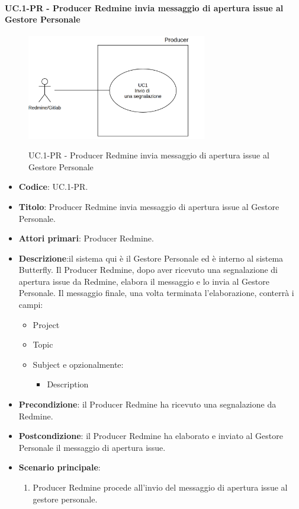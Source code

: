 	\paragraph{UC\theuccount.1-PR - Producer Redmine invia messaggio di apertura issue al Gestore Personale}
	\begin{figure}[H]
		\centering
		\includegraphics[width=0.7\textwidth]{img/UC1.png}\\
		\caption{UC\theuccount.1-PR - Producer Redmine invia messaggio di apertura issue al Gestore Personale}
	\end{figure}
	\begin{itemize}
		\item \textbf{Codice}: UC\theuccount.1-PR.
		\item \textbf{Titolo}: Producer Redmine invia messaggio di apertura issue al Gestore Personale.
		\item \textbf{Attori primari}: Producer Redmine.
		\item \textbf{Descrizione}:il sistema qui è il Gestore Personale
		ed è interno al sistema Butterfly. Il Producer Redmine, dopo aver
		ricevuto una segnalazione di apertura issue da Redmine, elabora
		il messaggio e lo invia al Gestore Personale.
		Il messaggio finale, una volta terminata l'elaborazione, conterrà i campi:
		\begin{itemize}
			\item Project
			\item Topic
			\item Subject e opzionalmente:
			\begin{itemize}
				\item Description
			\end{itemize}
		\end{itemize}
		\item \textbf{Precondizione}: il Producer Redmine ha ricevuto una segnalazione da Redmine.
		\item \textbf{Postcondizione}: il Producer Redmine ha elaborato e inviato al Gestore Personale il messaggio di apertura issue.
		\item \textbf{Scenario principale}: 
		\begin{enumerate}
			\item Producer Redmine procede all'invio del messaggio di
			apertura issue al gestore personale.
		\end{enumerate}
		
	\end{itemize}

